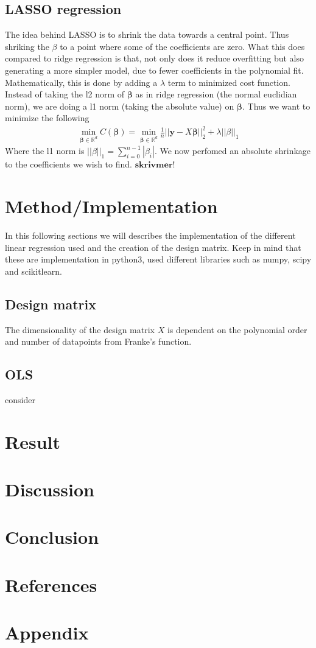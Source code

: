 \documentclass[a4paper, 10pt]{article}
\begin{document}
\subsection{LASSO regression} The idea behind LASSO is to shrink the data towards a central point. Thus shriking the $\beta$ to a point where some of the coefficients are zero. What this does compared to ridge regression is that, not only does it reduce overfitting but also generating a more simpler model, due to fewer coefficients in the polynomial fit.
\vspace{3mm}
\\
 Mathematically, this is done by adding a $\lambda$ term to minimized cost function. Instead of taking the l2 norm of $\boldsymbol{\beta}$ as in ridge regression (the normal euclidian norm), we are doing a l1 norm (taking the absolute value) on $\boldsymbol{\beta}$. Thus we want to minimize the following
\begin{align}
\min_{\boldsymbol{\beta}\in \mathbb{R}^{d}}C(\boldsymbol{\beta}) = \min_{\boldsymbol{\beta}\in \mathbb{R}^{d}}
\frac{1}{n}||\mathbf{y} - X\boldsymbol{\beta}||^{2}_{2} + \lambda||\beta||_{1}
\end{align}
Where the l1 norm is $||\beta||_{1} = \sum_{i = 0}^{n-1}|\beta_{i}|$. We now perfomed an absolute shrinkage to the coefficients we wish to find.
$\boldsymbol{skriv mer!}$
\section{Method/Implementation}
In this following sections we will describes the implementation of the different linear regression used and the creation of the design matrix. Keep in mind that these are implementation in python3, used different libraries such as numpy, scipy and scikitlearn.
\subsection{Design matrix} The dimensionality of the design matrix $X$ is dependent on the polynomial order and number of datapoints from Franke's function.
\subsection{OLS} consider
\section{Result}
\section{Discussion}
\section{Conclusion}
\section{References}
\section{Appendix}
\end{document}
